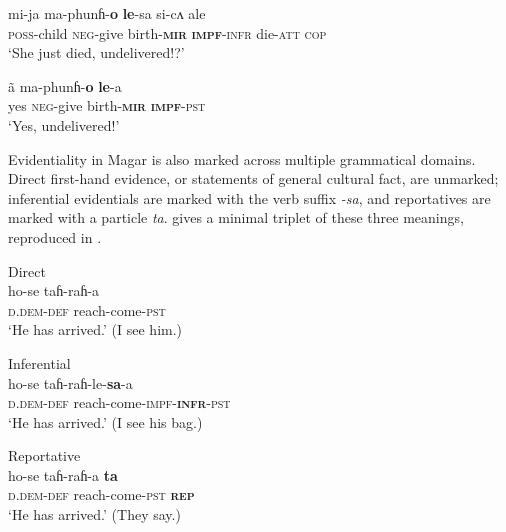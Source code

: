 \begin{exe}
  \ex \label{e:Methods:MagarMirativeAddOri}
  \begin{xlist}
    \ex \label{e:Methods:MagarMirativeAddOri:q}
    \gll mi-ja ma-phunɦ-\textbf{o} \textbf{le}-sa si-cʌ ale \\
    \textsc{poss}-child \textsc{neg}-{give birth}-\textbf{\textsc{mir}} \textsc{\textbf{impf}-infr} die-\textsc{att} \textsc{cop} \\
    \glt `She just died, undelivered!?'

    \ex \label{e:Methods:MagarMirativeAddOri:a}
    \gll ã ma-phunɦ-\textbf{o} \textbf{le}-a \\
    yes \textsc{neg}-{give birth}-\textbf{\textsc{mir}} \textsc{\textbf{impf}-pst} \\
    \glt `Yes, undelivered!'
  \end{xlist}
  \cite[Magar,][487]{GrunowHarsta2008}
\end{exe}

Evidentiality in Magar is also marked across multiple grammatical domains. Direct first-hand evidence, or statements of general cultural fact, are unmarked; inferential evidentials are marked with the verb suffix \textit{-sa}, and reportatives are marked with a particle \textit{ta}.  gives a minimal triplet of these three meanings, reproduced in .

\begin{exe}
  \ex \label{e:Methods:MagarEvidIntro}
  \begin{xlist}
    \ex Direct \\
    \gll ho-se taɦ-raɦ-a \\
    \textsc{d.dem-def} reach-come-\textsc{pst} \\
    \glt `He has arrived.' (I see him.)

    \ex Inferential \\
    \gll ho-se taɦ-raɦ-le-\textbf{sa}-a \\
    \textsc{d.dem-def} reach-come-\textsc{impf-\textbf{infr}-pst} \\
    \glt `He has arrived.' (I see his bag.)

    \ex Reportative \\
    \gll ho-se taɦ-raɦ-a \textbf{ta} \\
    \textsc{d.dem-def} reach-come-\textsc{pst} \textbf{\textsc{rep}} \\
    \glt `He has arrived.' (They say.)
  \end{xlist}
  \cite[Magar,][497]{GrunowHarsta2008}
\end{exe}

